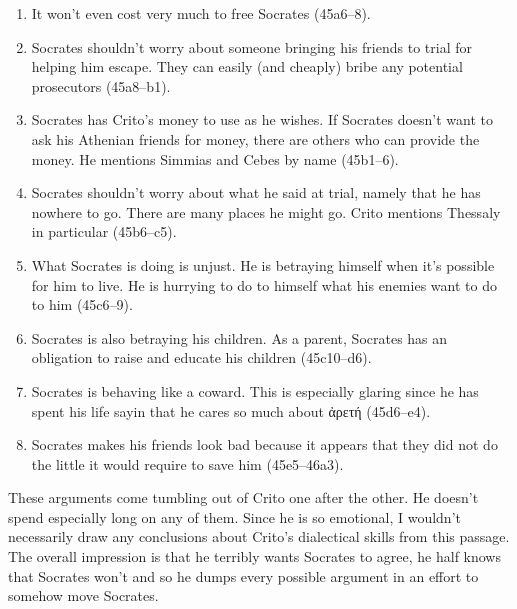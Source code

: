 \documentclass[11pt]{article}
\begin{document}
\begin{enumerate}

    \item It won't even cost very much to free Socrates (45a6--8).

    \item Socrates shouldn't worry about someone bringing his friends to
        trial for helping him escape.  They can easily (and cheaply) bribe
        any potential prosecutors (45a8--b1).

    \item Socrates has Crito's money to use as he wishes.  If Socrates
        doesn't want to ask his Athenian friends for money, there are
        others who can provide the money.  He mentions Simmias and Cebes by
        name (45b1--6).

    \item Socrates shouldn't worry about what he said at trial, namely that
        he has nowhere to go.  There are many places he might go.  Crito
        mentions Thessaly in particular (45b6--c5).

    \item What Socrates is doing is unjust.  He is betraying himself when
        it's possible for him to live.  He is hurrying to do to himself
        what his enemies want to do to him (45c6--9).

    \item Socrates is also betraying his children.  As a parent, Socrates
        has an obligation to raise and educate his children (45c10--d6).

    \item Socrates is behaving like a coward.  This is especially glaring
        since he has spent his life sayin that he cares so much about {\g
        ἀρετή} (45d6--e4).

    \item Socrates makes his friends look bad because it appears that they
        did not do the little it would require to save him (45e5--46a3).

\end{enumerate}

These arguments come tumbling out of Crito one after the other.  He doesn't
spend especially long on any of them.  Since he is so emotional, I wouldn't
necessarily draw any conclusions about Crito's dialectical skills from this
passage.  The overall impression is that he terribly wants Socrates to
agree, he half knows that Socrates won't and so he dumps every possible
argument in an effort to somehow move Socrates.
\end{document}
